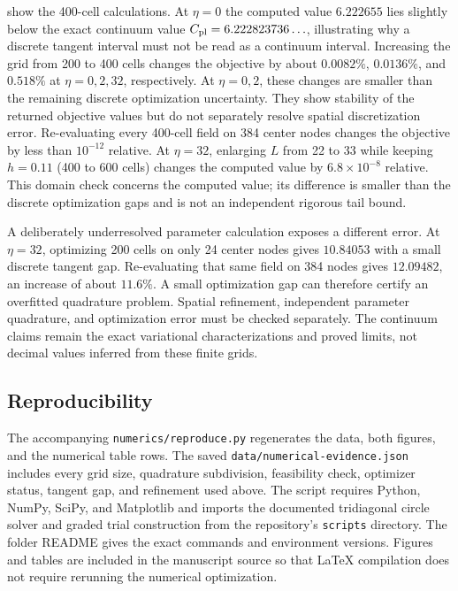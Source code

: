  show the 400-cell
calculations. At $\eta=0$ the computed value $6.222655$ lies
slightly below the exact continuum value
$C_{\rm pl}=6.222823736\ldots$, illustrating why a discrete
tangent interval must not be read as a continuum interval.
Increasing the grid from 200 to 400 cells changes the objective
by about $0.0082\%$, $0.0136\%$, and $0.518\%$ at
$\eta=0,2,32$, respectively. At $\eta=0,2$, these changes are smaller
than the remaining discrete optimization uncertainty. They show
stability of the returned objective values but do not separately
resolve spatial discretization error. Re-evaluating every 400-cell field
on 384 center nodes changes the objective by less than
$10^{-12}$ relative. At $\eta=32$, enlarging $L$ from 22 to 33
while keeping $h=0.11$ (400 to 600 cells) changes the computed
value by $6.8\times10^{-8}$ relative. This domain check concerns
the computed value; its difference is smaller than the discrete
optimization gaps and is not an independent rigorous tail bound.

A deliberately underresolved parameter calculation exposes a
different error. At $\eta=32$, optimizing 200 cells on only 24
center nodes gives $10.84053$ with a small discrete tangent gap.
Re-evaluating that same field on 384 nodes gives $12.09482$, an
increase of about $11.6\%$. A small optimization gap can therefore
certify an overfitted quadrature problem. Spatial refinement,
independent parameter quadrature, and optimization error must be
checked separately. The continuum claims remain the exact
variational characterizations and proved limits, not decimal
values inferred from these finite grids.

\subsection{Reproducibility}
The accompanying \texttt{numerics/reproduce.py} regenerates the
data, both figures, and the numerical table rows. The saved
\texttt{data/numerical-evidence.json} includes every grid size,
quadrature subdivision, feasibility check, optimizer status,
tangent gap, and refinement used above. The script requires
Python, NumPy, SciPy, and Matplotlib and imports the documented
tridiagonal circle solver and graded trial construction from the
repository's \texttt{scripts} directory. The folder README gives
the exact commands and environment versions. Figures and tables
are included in the manuscript source so that LaTeX compilation
does not require rerunning the numerical optimization.
